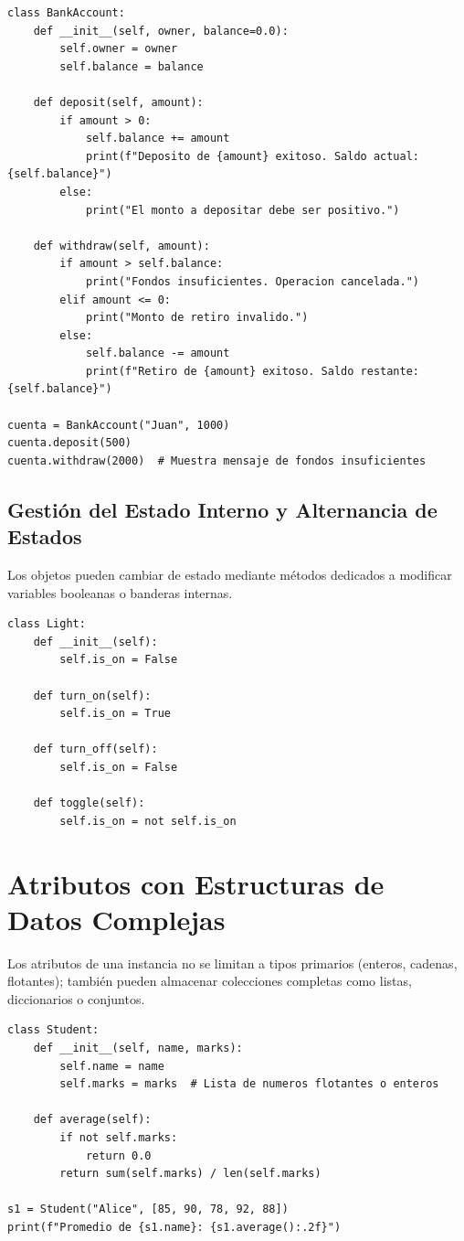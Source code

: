 \begin{lstlisting}[caption={Clase BankAccount con validación de saldo.}, label={list:bank_account}]
class BankAccount:
    def __init__(self, owner, balance=0.0):
        self.owner = owner
        self.balance = balance

    def deposit(self, amount):
        if amount > 0:
            self.balance += amount
            print(f"Deposito de {amount} exitoso. Saldo actual: {self.balance}")
        else:
            print("El monto a depositar debe ser positivo.")

    def withdraw(self, amount):
        if amount > self.balance:
            print("Fondos insuficientes. Operacion cancelada.")
        elif amount <= 0:
            print("Monto de retiro invalido.")
        else:
            self.balance -= amount
            print(f"Retiro de {amount} exitoso. Saldo restante: {self.balance}")

cuenta = BankAccount("Juan", 1000)
cuenta.deposit(500)
cuenta.withdraw(2000)  # Muestra mensaje de fondos insuficientes
\end{lstlisting}

\subsection{Gestión del Estado Interno y Alternancia de Estados}
Los objetos pueden cambiar de estado mediante métodos dedicados a modificar variables booleanas o banderas internas.

\begin{lstlisting}[caption={Clase Light con métodos para alternar su estado.}, label={list:light}]
class Light:
    def __init__(self):
        self.is_on = False

    def turn_on(self):
        self.is_on = True

    def turn_off(self):
        self.is_on = False

    def toggle(self):
        self.is_on = not self.is_on
\end{lstlisting}

\section{Atributos con Estructuras de Datos Complejas}
Los atributos de una instancia no se limitan a tipos primarios (enteros, cadenas, flotantes); también pueden
almacenar colecciones completas como listas, diccionarios o conjuntos.

\begin{lstlisting}[caption={Clase Student almacenando una lista de notas.}, label={list:student}]
class Student:
    def __init__(self, name, marks):
        self.name = name
        self.marks = marks  # Lista de numeros flotantes o enteros

    def average(self):
        if not self.marks:
            return 0.0
        return sum(self.marks) / len(self.marks)

s1 = Student("Alice", [85, 90, 78, 92, 88])
print(f"Promedio de {s1.name}: {s1.average():.2f}")
\end{lstlisting}
